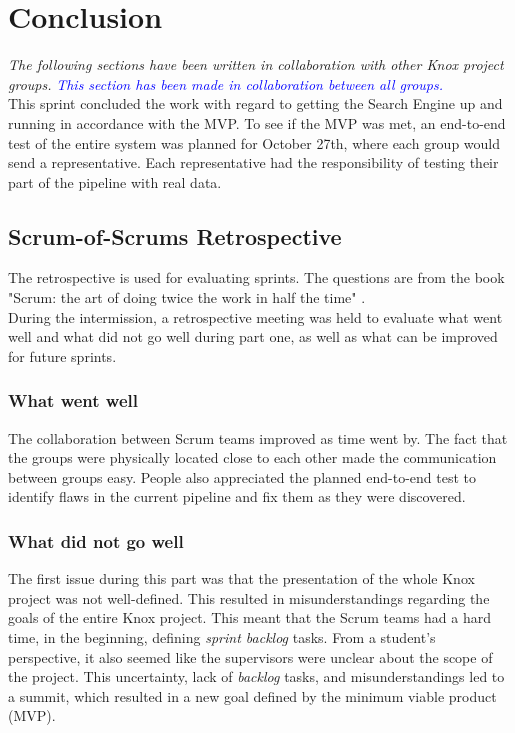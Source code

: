 \section{Conclusion}\label{scrumofscrumsConclusion}
\textit{The following sections have been written in collaboration with other Knox project groups.}
\textcolor{blue}{\textit{This section has been made in collaboration between all groups.}} \\

\noindent This sprint concluded the work with regard to getting the Search Engine up and running in accordance with the MVP. To see if the MVP was met, an end-to-end test of the entire system was planned for October 27th, where each group would send a representative. Each representative had the responsibility of testing their part of the pipeline with real data. 

\subsection{Scrum-of-Scrums Retrospective}\label{scrumofscrumRetrospective}
The retrospective is used for evaluating sprints. The questions are from the book "Scrum: the art of doing twice the work in half the time" \cite[p. 238]{sutherland2014scrum}.\\
\noindent During the intermission, a retrospective meeting was held to evaluate what went well and what did not go well during part one, as well as what can be improved for future sprints. 

\subsubsection{What went well}
The collaboration between Scrum teams improved as time went by. The fact that the groups were physically located close to each other made the communication between groups easy. People also appreciated the planned end-to-end test to identify flaws in the current pipeline and fix them as they were discovered.

\subsubsection{What did not go well}
The first issue during this part was that the presentation of the whole Knox project was not well-defined. This resulted in misunderstandings regarding the goals of the entire Knox project. This meant that the Scrum teams had a hard time, in the beginning, defining \textit{sprint backlog} tasks. From a student's perspective, it also seemed like the supervisors were unclear about the scope of the project. This uncertainty, lack of \textit{backlog} tasks, and misunderstandings led to a summit, which resulted in a new goal defined by the minimum viable product (MVP).\\

